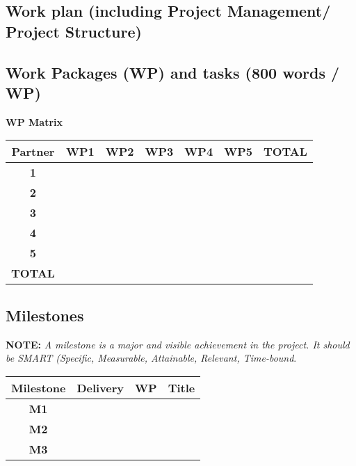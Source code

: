 \documentclass[11pt,twoside,a4paper]{article}
\begin{document}
\subsection{Work plan (including Project Management/ Project Structure)}


\subsection{Work Packages (WP) and tasks (800 words / WP)}

% 
% 
% 
% 
% 
% 


\textbf{WP Matrix}

\begin{table}[H]
    \centering
    \begin{tabular}{|c||c|c|c|c|c|c|}
        \hline
        \rowcolor{lightgray}
        \textbf{Partner} & \textbf{WP1} & \textbf{WP2} & \textbf{WP3} & \textbf{WP4} & \textbf{WP5} & \textbf{TOTAL}\\\hline
        \hline
        \textbf{1}     & & & & & & \\\hline
        \textbf{2}     & & & & & & \\\hline
        \textbf{3}     & & & & & & \\\hline
        \textbf{4}     & & & & & & \\\hline
        \textbf{5}     & & & & & & \\\hline
        \rowcolor{lightgray}
        \textbf{TOTAL} & & & & & & \\\hline
    \end{tabular}
\end{table}

\subsection{Milestones}
\label{sub:milestones}

\textbf{NOTE:} \emph{A milestone is a major and visible achievement in the
  project. It should be SMART (Specific, Measurable, Attainable, Relevant,
  Time-bound}.  

\begin{table}[H]
    \centering
    \begin{tabular}{|c||c|c|p{}|}
        \hline
        \rowcolor{lightgray}
        \textbf{Milestone} & \textbf{Delivery} & \textbf{WP} & \textbf{Title}\\\hline
        \hline
        \textbf{M1}     & & &  \\\hline
        \textbf{M2}     & & &  \\\hline
        \textbf{M3}     & & &  \\\hline
    \end{tabular}
\end{table}
\end{document}
